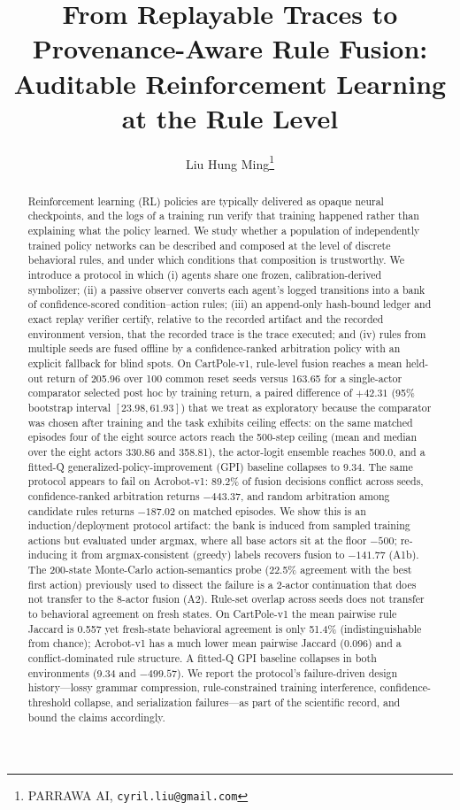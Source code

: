 \documentclass[11pt]{article}
\title{From Replayable Traces to Provenance-Aware Rule Fusion:\\ Auditable Reinforcement Learning at the Rule Level}
\author{Liu Hung Ming\thanks{PARRAWA AI, \texttt{cyril.liu@gmail.com} }}
\begin{document}
\maketitle

\begin{abstract}
Reinforcement learning (RL) policies are typically delivered as opaque neural
checkpoints, and the logs of a training run verify that training happened rather than
explaining what the policy learned. We study whether a population of independently trained policy
networks can be described and composed at the level of discrete behavioral rules, and under which
conditions that composition is trustworthy. We introduce a protocol in which (i) agents share one
frozen, calibration-derived symbolizer; (ii) a passive observer converts each agent's logged
transitions into a bank of confidence-scored condition--action rules; (iii) an append-only hash-bound
ledger and exact replay verifier certify, relative to the recorded artifact and the recorded
environment version, that the recorded trace is the trace executed; and (iv) rules
from multiple seeds are fused offline by a confidence-ranked arbitration policy with an explicit
fallback for blind spots. On CartPole-v1, rule-level fusion reaches a mean held-out return of 205.96
over 100 common reset seeds versus 163.65 for a single-actor comparator selected post hoc by training
return, a paired difference of $+42.31$
(95\% bootstrap interval $[23.98,61.93]$) that we treat as exploratory because the comparator was
chosen after training and the task exhibits ceiling effects: on the same matched episodes four of the
eight source actors reach the 500-step ceiling (mean and median over the eight actors 330.86 and
358.81), the
actor-logit ensemble reaches 500.0, and a fitted-Q generalized-policy-improvement (GPI) baseline
collapses to 9.34. The same protocol appears to fail on Acrobot-v1: 89.2\% of fusion decisions conflict across seeds,
confidence-ranked arbitration returns $-443.37$, and random arbitration among candidate rules returns
$-187.02$ on matched episodes. We show this is an induction/deployment protocol artifact: the bank is
induced from sampled training actions but evaluated under argmax, where all base actors sit at the floor
$-500$; re-inducing it from argmax-consistent (greedy) labels recovers fusion to $-141.77$ (A1b). The
200-state Monte-Carlo action-semantics probe (22.5\% agreement with the best first action) previously
used to dissect the failure is a 2-actor continuation that does not transfer to the 8-actor fusion (A2).
Rule-set overlap across seeds does not transfer to behavioral agreement on fresh states. On
CartPole-v1 the mean pairwise rule Jaccard is 0.557 yet fresh-state behavioral agreement is only
51.4\% (indistinguishable from chance); Acrobot-v1 has a much lower mean pairwise Jaccard (0.096)
and a conflict-dominated rule structure. A fitted-Q GPI baseline collapses in both environments
(9.34 and $-499.57$). We report the protocol's failure-driven design history---lossy grammar compression,
rule-constrained training interference, confidence-threshold collapse, and serialization
failures---as part of the scientific record, and bound the claims accordingly.


\end{abstract}
\end{document}
